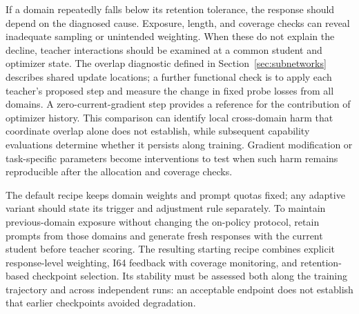If a domain repeatedly falls below its retention tolerance, the response should depend on the diagnosed cause. Exposure, length, and coverage checks can reveal inadequate sampling or unintended weighting. When these do not explain the decline, teacher interactions should be examined at a common student and optimizer state. The overlap diagnostic defined in Section~\ref{sec:subnetworks} describes shared update locations; a further functional check is to apply each teacher's proposed step and measure the change in fixed probe losses from all domains. A zero-current-gradient step provides a reference for the contribution of optimizer history. This comparison can identify local cross-domain harm that coordinate overlap alone does not establish, while subsequent capability evaluations determine whether it persists along training. Gradient modification or task-specific parameters become interventions to test when such harm remains reproducible after the allocation and coverage checks.

The default recipe keeps domain weights and prompt quotas fixed; any adaptive variant should state its trigger and adjustment rule separately. To maintain previous-domain exposure without changing the on-policy protocol, retain prompts from those domains and generate fresh responses with the current student before teacher scoring. The resulting starting recipe combines explicit response-level weighting, I64 feedback with coverage monitoring, and retention-based checkpoint selection. Its stability must be assessed both along the training trajectory and across independent runs: an acceptable endpoint does not establish that earlier checkpoints avoided degradation.

